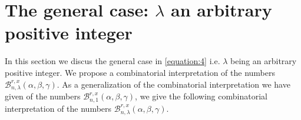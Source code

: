 \documentclass[12pt]{amsart}
\newtheorem{proof 1}{proof 1}
\newtheorem{theorem}{Theorem}[section]
\begin{document}

	

\section{The general case: $\lambda$ an arbitrary positive integer\label{section:3}}

In this section we discus the general case in \eqref{equation:4} i.e. $\lambda$ being an arbitrary positive integer. We propose a combinatorial interpretation of the numbers $\mathcal{B}^{r,x}_{n,\lambda}(\alpha,\beta,\gamma)$. As a generalization of the combinatorial interpretation we have given of the numbers $\mathcal{B}^{r,x}_{n,1}(\alpha,\beta,\gamma)$, we give the following combinatorial interpretation of the numbers  $\mathcal{B}^{r,x}_{n,\lambda}(\alpha,\beta,\gamma)$.
\end{document}
